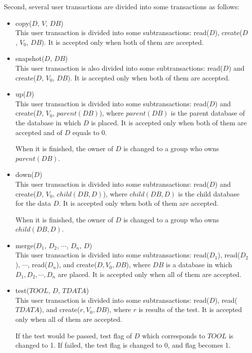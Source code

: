 Second, several user transactions are divided into some 
transactions as follows:
\begin{itemize}
\item copy($D$, $V$, $DB$)\\
This user transaction is divided into some subtransactions:
read($D$), create($D$, $V_0$, $DB$).
It is accepted only when both of them are accepted.
\item snapshot($D$, $DB$)\\
This user transaction is also divided into some subtransactions:
read($D$) and create($D$, $V_0$, $DB$).
It is accepted only when both of them are accepted.
\item up($D$)\\
This user transaction is divided into some subtransactions:
read($D$) and create($D$, $V_0$, $parent(DB)$), where $parent(DB)$ 
is the parent database of the database in which $D$ is placed.
It is accepted only when both of them are accepted and \deterr of $D$ 
equals to 0.

When it is finished, the owner of $D$ is changed to a group who owns
$parent(DB)$.
\item down($D$)\\
This user transaction is divided into some subtransactions:
read($D$) and create($D$, $V_0$, $child(DB, D)$), where $child(DB, 
D)$ is the child database for the data $D$.
It is accepted only when both of them are accepted.

When it is finished, the owner of $D$ is changed to a group who owns
$child(DB, D)$.
\item merge($D_1$, $D_2$, $\cdots$, $D_n$, $D$)\\
This user transaction is divided into some subtransactions:
read($D_1$), read($D_2$), $\cdots$, read($D_n$), and create($D, V_0, DB$), 
where $DB$ is a database in which $D_1, D_2, \cdots, D_n$ are placed.
It is accepted only when all of them are accepted.
\item test($TOOL$, $D$, $TDATA$)\\
This user transaction is divided into some subtransactions:
read($D$), read($TDATA$), and create($r, V_0, DB$), where
$r$ is results of the test.
It is accepted only when all of them are accepted.

If the test would be passed, test flag of $D$ which corresponds to 
$TOOL$ is changed to 1. If failed, the test flag is changed to 0, and 
\deterr flag becomes 1. 
\end{itemize}

